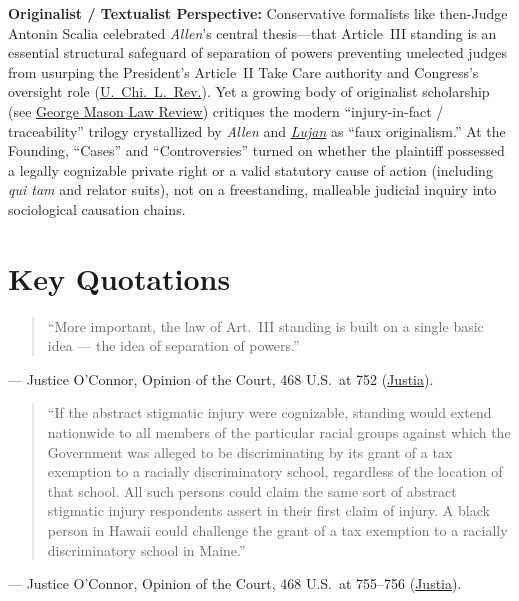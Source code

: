 \documentclass[12pt]{article}
\begin{document}
\textbf{Originalist / Textualist Perspective:} Conservative formalists like then-Judge Antonin Scalia celebrated \textit{Allen}'s central thesis---that Article~III standing is an essential structural safeguard of separation of powers preventing unelected judges from usurping the President's Article~II Take Care authority and Congress's oversight role (\href{https://lawreview.uchicago.edu/print-archive/justice-scalias-other-standing-legacy}{U.\ Chi.\ L.\ Rev.}). Yet a growing body of originalist scholarship (see \href{https://lawreview.gmu.edu/print__issues/the-court-continues-to-confuse-standing-the-pitfalls-of-faux-article-iii-originalism/}{George Mason Law Review}) critiques the modern ``injury-in-fact / traceability'' trilogy crystallized by \textit{Allen} and \href{https://supreme.justia.com/cases/federal/us/504/555/}{\textit{Lujan}} as ``faux originalism.'' At the Founding, ``Cases'' and ``Controversies'' turned on whether the plaintiff possessed a legally cognizable private right or a valid statutory cause of action (including \textit{qui tam} and relator suits), not on a freestanding, malleable judicial inquiry into sociological causation chains.

\section{Key Quotations}
\begin{quote}
``More important, the law of Art.\ III standing is built on a single basic idea --- the idea of separation of powers.''
\end{quote}
\noindent --- Justice O'Connor, Opinion of the Court, 468 U.S.\ at 752 (\href{https://supreme.justia.com/cases/federal/us/468/737/}{Justia}).

\begin{quote}
``If the abstract stigmatic injury were cognizable, standing would extend nationwide to all members of the particular racial groups against which the Government was alleged to be discriminating by its grant of a tax exemption to a racially discriminatory school, regardless of the location of that school. All such persons could claim the same sort of abstract stigmatic injury respondents assert in their first claim of injury. A black person in Hawaii could challenge the grant of a tax exemption to a racially discriminatory school in Maine.''
\end{quote}
\noindent --- Justice O'Connor, Opinion of the Court, 468 U.S.\ at 755--756 (\href{https://supreme.justia.com/cases/federal/us/468/737/}{Justia}).
\end{document}
